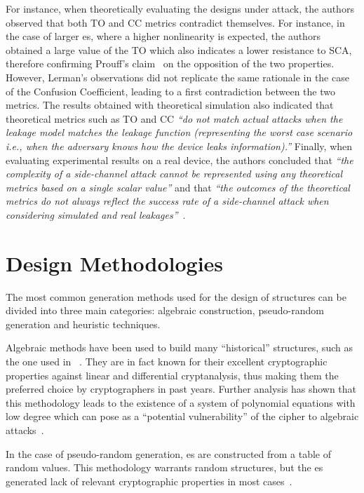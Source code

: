         For instance, when theoretically evaluating the designs under attack, the authors observed that both  TO and CC metrics contradict themselves. For instance, in the case of larger \sbocs{}es, where a higher nonlinearity is expected, the authors obtained a large value of the TO which also indicates a lower resistance to SCA, therefore confirming Prouff's claim~\cite{prouff2005dpa} on the opposition of the two properties. However, Lerman's observations did not replicate the same rationale in the case of the Confusion Coefficient, leading to a first contradiction between the two metrics. The results obtained with theoretical simulation also indicated that theoretical metrics such as TO and CC \emph{``do not match actual attacks when the leakage model matches the leakage function (representing the worst case scenario i.e., when the adversary knows how the device leaks information).''}
        Finally, when evaluating experimental results on a real device, the authors concluded that \emph{``the complexity of a side-channel attack cannot be represented using any theoretical metrics based on a single scalar value''} and that \emph{``the outcomes of the theoretical metrics do not always reflect the success rate of a side-channel attack when considering simulated and real leakages''}~\cite{lerman2016comparing}.
   

\section{Design Methodologies}

    The most common generation methods used for the design of \sbocs{} structures can be divided into three main categories: algebraic construction, pseudo-random generation and heuristic techniques. 
    
    Algebraic methods have been used to build many ``historical'' \sbocs{} structures, such as the one used in \aes{}~\cite{daemen1999aes}. They are in fact known for their excellent cryptographic properties against linear and differential cryptanalysis, thus making them the preferred choice by cryptographers in past years. Further analysis has shown that this methodology leads to the existence of a system of polynomial equations with low degree which can pose as a ``potential vulnerability'' of the cipher to algebraic attacks~\cite{de2017generation}.

    In the case of pseudo-random generation, \sbocs{}es are constructed from a table of random values. This methodology warrants random structures, but the \sbocs{}es generated lack of relevant cryptographic properties in most cases~\cite{freyre2020evolving}. 
    
